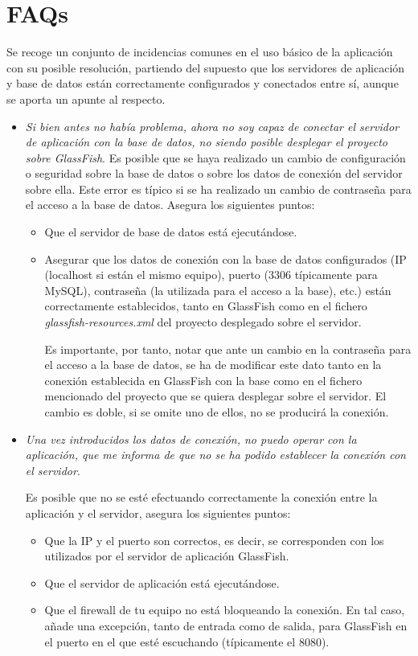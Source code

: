 \chapter{FAQs}
\label{app:faq}

Se recoge un conjunto de incidencias comunes en el uso básico de la aplicación con su posible resolución, partiendo del supuesto que los servidores de aplicación y base de datos están correctamente configurados y conectados entre sí, aunque se aporta un apunte al respecto.

\begin{itemize}
	\item \textit{Si bien antes no había problema, ahora no soy capaz de conectar el servidor de aplicación con la base de datos, no siendo posible desplegar el proyecto sobre GlassFish}. Es posible que se haya realizado un cambio de configuración o seguridad sobre la base de datos o sobre los datos de conexión del servidor sobre ella. Este error es típico si se ha realizado un cambio de contraseña para el acceso a la base de datos. Asegura los siguientes puntos:
	
	\begin{itemize}
		\item Que el servidor de base de datos está ejecutándose.
		\item Asegurar que los datos de conexión con la base de datos configurados (IP (localhost si están el mismo equipo), puerto (3306 típicamente para MySQL), contraseña (la utilizada para el acceso a la base), etc.) están correctamente establecidos, tanto en GlassFish como en el fichero \emph{glassfish-resources.xml} del proyecto desplegado sobre el servidor. 
		
		Es importante, por tanto, notar que ante un cambio en la contraseña para el acceso a la base de datos, se ha de modificar este dato tanto en la conexión establecida en GlassFish con la base como en el fichero mencionado del proyecto que se quiera desplegar sobre el servidor. El cambio es doble, si se omite uno de ellos, no se producirá la conexión.
	\end{itemize}
	
	
	\item \textit{Una vez introducidos los datos de conexión, no puedo operar con la aplicación, que me informa de que no se ha podido establecer la conexión con el servidor}.
	
	Es posible que no se esté efectuando correctamente la conexión entre la aplicación y el servidor, asegura los siguientes puntos:
	\begin{itemize}
		\item Que la IP y el puerto son correctos, es decir, se corresponden con los utilizados por el servidor de aplicación GlassFish.
		\item Que el servidor de aplicación está ejecutándose.
		\item Que el firewall de tu equipo no está bloqueando la conexión. En tal caso, añade una excepción, tanto de entrada como de salida, para GlassFish en el puerto en el que esté escuchando (típicamente el 8080).
	\end{itemize}
	

\end{itemize}
